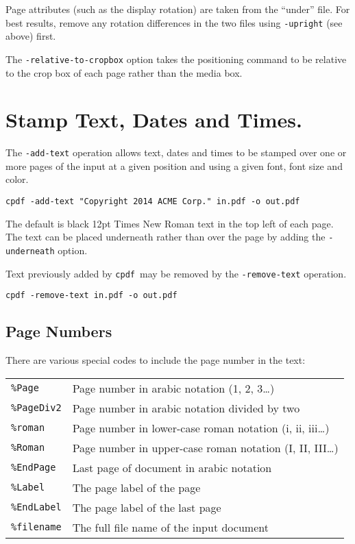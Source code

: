 \documentclass{book}
\newcommand{\cpdf}{\texttt{cpdf}}
\begin{document}
\noindent Page attributes (such as the display rotation) are taken from the ``under''
file. For best results, remove any rotation differences in the two files using
\texttt{-upright} (see above) first.

\noindent The \texttt{-relative-to-cropbox} option takes the positioning command to be relative to the crop box of each page rather than the media box.

  \section{Stamp Text, Dates and Times.}
  The \texttt{-add-text} operation allows text, dates and times to be stamped
over one or more pages of the input at a given position and using a given font,
font size and color.
  \begin{framed}
    \small\verb!cpdf -add-text "Copyright 2014 ACME Corp." in.pdf -o out.pdf!
  \end{framed}
  \noindent The default is black 12pt Times New Roman text in the top left of each page. The text can be placed underneath rather than over the page by adding the \texttt{-underneath} option.
  
  Text previously added by \cpdf\ may be removed by the \texttt{-remove-text} operation.
  \begin{framed}
    \small\verb!cpdf -remove-text in.pdf -o out.pdf!
  \end{framed}

  \subsection{Page Numbers}
  There are various special codes to include the page number in the text:

  \vspace{2mm}
  \begin{tabular}{ll}
    \texttt{\%Page} & Page number in arabic notation (1, 2, 3\ldots) \\
    \texttt{\%PageDiv2} & Page number in arabic notation divided by two \\
    \texttt{\%roman} & Page number in lower-case roman notation (i, ii, iii\ldots) \\
    \texttt{\%Roman} & Page number in upper-case roman notation (I, II, III\ldots) \\
    \texttt{\%EndPage} & Last page of document in arabic notation \\
    \texttt{\%Label} & The page label of the page \\
    \texttt{\%EndLabel} & The page label of the last page \\
    \texttt{\%filename} & The full file name of the input document \\
  \end{tabular}
\end{document}
